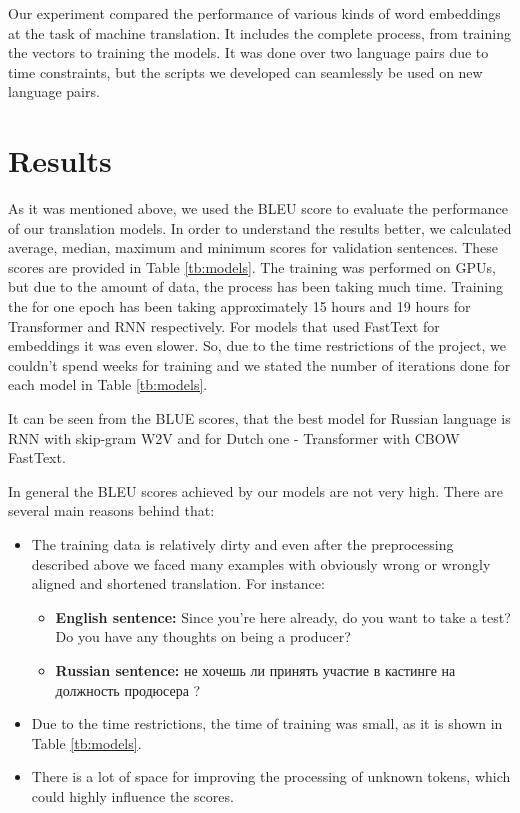 \documentclass{article}
\begin{document}
Our experiment compared the performance of various kinds of word embeddings at the task of machine translation. It includes the complete process, from training the vectors to training the models. It was done over two language pairs due to time constraints, but the scripts we developed can seamlessly be used on new language pairs.


\section*{Results}

As it was mentioned above, we used the BLEU score to evaluate the performance of our translation models. In order to understand the results better, we calculated average, median, maximum and minimum scores for validation sentences. These scores are provided in Table \ref{tb:models}. The training was performed on GPUs, but due to the amount of data, the process has been taking much time. Training the for one epoch has been taking approximately 15 hours and 19 hours for Transformer and RNN respectively. For models that used FastText for embeddings it was even slower. So, due to the time restrictions of the project, we couldn't spend weeks for training and we stated the number of iterations done for each model in Table \ref{tb:models}.

It can be seen from the BLUE scores, that the best model for Russian language is RNN with skip-gram W2V and for Dutch one - Transformer with CBOW FastText.

In general the BLEU scores achieved by our models are not very high. There are several main reasons behind that:
\begin{itemize}
    \item The training data is relatively dirty and even after the preprocessing described above we faced many examples with obviously wrong or wrongly aligned  and shortened translation. For instance:
    \begin{itemize}
        \item \textbf{English sentence:} Since you're here already, do you want to take a test? Do you have any thoughts on being a producer?
        \item \textbf{Russian sentence:} не хочешь ли принять участие в кастинге на должность продюсера ?
    \end{itemize}
    \item Due to the time restrictions, the time of training was small, as it is shown in Table \ref{tb:models}.
    \item There is a lot of space for improving the processing of unknown tokens, which could highly influence the scores.
\end{itemize}
\end{document}
